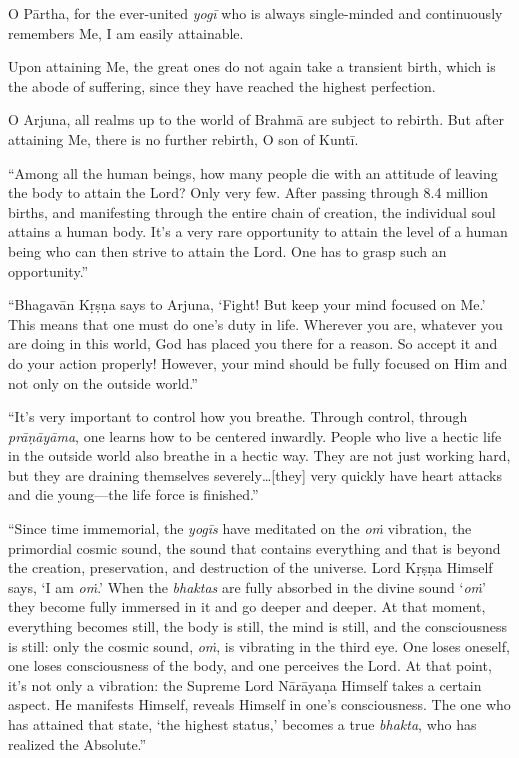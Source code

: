 {O Pārtha, for the ever-united \textit{yogī} who is always single-minded and continuously remembers Me, I am easily attainable.}

{Upon attaining Me, the great ones do not again take a transient birth, which is the abode of suffering, since they have reached the highest perfection.}

{O Arjuna, all realms up to the world of Brahmā are subject to rebirth. But after attaining Me, there is no further rebirth, O son of Kuntī.}

\enquote{Among all the human beings, how many people die with an attitude of leaving the body to attain the Lord? Only very few. After passing through 8.4 million births, and manifesting through the entire chain of creation, the individual soul attains a human body. It’s a very rare opportunity to attain the level of a human being who can then strive to attain the Lord. One has to grasp such an opportunity.}

\enquote{Bhagavān Kṛṣṇa says to Arjuna, \enquote{Fight! But keep your mind focused on Me.} This means that one must do one’s duty in life. Wherever you are, whatever you are doing in this world, God has placed you there for a reason. So accept it and do your action properly! However, your mind should be fully focused on Him and not only on the outside world.}

\enquote{It’s very important to control how you breathe. Through control, through \textit{prāṇāyāma}, one learns how to be centered inwardly. People who live a hectic life in the outside world also breathe in a hectic way. They are not just working hard, but they are draining themselves severely\ldots [they] very quickly have heart attacks and die young---the life force is finished.}

\enquote{Since time immemorial, the \textit{yogīs} have meditated on the \textit{oṁ} vibration, the primordial cosmic sound, the sound that contains everything and that is beyond the creation, preservation, and destruction of the universe. Lord Kṛṣṇa Himself says, \enquote{I am \textit{oṁ}.} When the \textit{bhaktas} are fully absorbed in the divine sound \enquote{\textit{oṁ}} they become fully immersed in it and go deeper and deeper. At that moment, everything becomes still, the body is still, the mind is still, and the consciousness is still: only the cosmic sound, \textit{oṁ}, is vibrating in the third eye. One loses oneself, one loses consciousness of the body, and one perceives the Lord. At that point, it’s not only a vibration: the Supreme Lord Nārāyaṇa Himself takes a certain aspect. He manifests Himself, reveals Himself in one’s consciousness. The one who has attained that state, \enquote{the highest status,} becomes a true \textit{bhakta}, who has realized the Absolute.}

